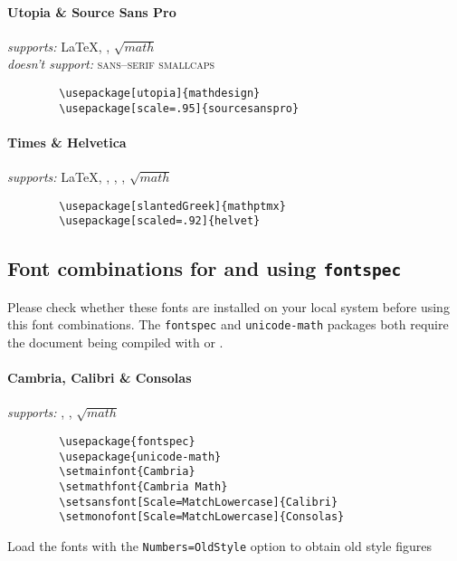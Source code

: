 \documentclass[11pt]{ltxdoc}
\begin{document}
	\paragraph*{Utopia \& Source Sans Pro} \hfill
	\textit{supports:} \LaTeX, , $\sqrt{math}$ \\
	\textit{doesn't support:} \textsc{\textsf{sans--serif smallcaps}} \nopagebreak\vspace{-2em}
	\begin{verbatim}
		\usepackage[utopia]{mathdesign}
		\usepackage[scale=.95]{sourcesanspro}	
	\end{verbatim}
	
	\paragraph*{Times \& Helvetica} \hfill
	\textit{supports:} \LaTeX, , , , $\sqrt{math}$ \nopagebreak\vspace{-.75em}
	\begin{verbatim}
		\usepackage[slantedGreek]{mathptmx}
		\usepackage[scaled=.92]{helvet}
	\end{verbatim}

	
	\justifying
	\subsection{Font combinations for  and  using \texttt{fontspec}}
	Please check whether these fonts are installed on your local system before using this font combinations.
	The \texttt{fontspec} and \texttt{unicode-math} packages both require the document being compiled with  or .
	
	\raggedleft
	\paragraph*{Cambria, Calibri \& Consolas} \hfill
	\textit{supports:} , , $\sqrt{math}$ \nopagebreak\vspace{-.75em}
	\begin{verbatim}
		\usepackage{fontspec}
		\usepackage{unicode-math}
		\setmainfont{Cambria}
		\setmathfont{Cambria Math}
		\setsansfont[Scale=MatchLowercase]{Calibri}
		\setmonofont[Scale=MatchLowercase]{Consolas}
	\end{verbatim}
	\vspace{-.75em}
	Load the fonts with the \texttt{Numbers=OldStyle} option to obtain old style figures  \hfill \hspace{.01pt}
	
\end{document}
